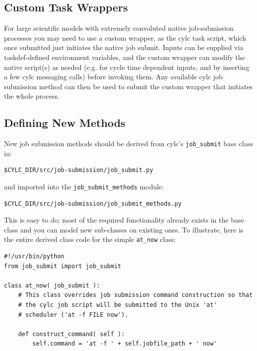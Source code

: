 \documentclass[11pt,a4paper]{article}
\begin{document}
\subsection{Custom Task Wrappers}

For large scientific models with extremely convoluted native
job-submission processes you may need to use a custom wrapper, 
as the cylc task script, which once submitted just initiates the 
native job submit. Inputs can be supplied via taskdef-defined
environment variables, and the custom wrapper can modify the native
script(s) as needed (e.g. for cycle time dependent inputs, and by
inserting a few cylc messaging calls) before invoking them.
Any available cylc job submission method can then be used to submit the
custom wrapper that initiates the whole process.

\subsection{Defining New Methods}

New job submission methods should be derived from cylc's
\lstinline=job_submit= base class in:

\begin{lstlisting}
$CYLC_DIR/src/job-submission/job_submit.py
\end{lstlisting}

and imported into the \lstinline=job_submit_methods= module:

\begin{lstlisting}
$CYLC_DIR/src/job-submission/job_submit_methods.py
\end{lstlisting}

This is easy to do; most of the required functionality already exists in
the base class and you can model new sub-classes on existing ones. To
illustrate, here is the entire derived class code for the simple 
\lstinline=at_now= class:

\lstset{language=Python}

\begin{lstlisting}
#!/usr/bin/python
from job_submit import job_submit

class at_now( job_submit ):
    # This class overrides job submission command construction so that
    # the cylc job script will be submitted to the Unix 'at'
    # scheduler ('at -f FILE now').

    def construct_command( self ):
        self.command = 'at -f ' + self.jobfile_path + ' now'
\end{lstlisting}
\end{document}
